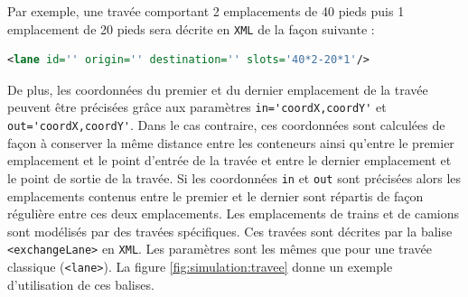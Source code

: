 Par exemple, une travée comportant 2 emplacements de 40 pieds puis 1 emplacement de 20 pieds sera décrite en \verb!XML! de la façon suivante :
\begin{lstlisting}[language=XML]
<lane id='' origin='' destination='' slots='40*2-20*1'/>
\end{lstlisting}

De plus, les coordonnées du premier et du dernier emplacement de la travée peuvent être précisées grâce aux paramètres \verb!in='coordX,coordY'! et \verb!out='coordX,coordY'!. Dans le cas contraire, ces coordonnées sont calculées de façon à conserver la même distance entre les conteneurs ainsi qu'entre le premier emplacement et le point d'entrée de la travée et entre le dernier emplacement et le point de sortie de la travée. Si les coordonnées \verb!in! et \verb!out! sont précisées alors les emplacements contenus entre le premier et le dernier sont répartis de façon régulière entre ces deux emplacements. 
Les emplacements de trains et de camions sont modélisés par des travées spécifiques. Ces travées sont décrites par la balise \verb!<exchangeLane>! en \verb!XML!. Les paramètres sont les mêmes que pour une travée classique (\verb!<lane>!). La figure \ref{fig:simulation:travee} donne un exemple d'utilisation de ces balises.


